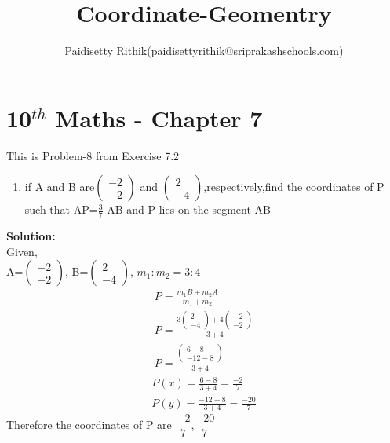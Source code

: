 \documentclass[12pt]{article}
\title{Coordinate-Geomentry}
\author{Paidisetty Rithik(paidisettyrithik@sriprakashschools.com)}
\newcommand{\myvec}[1]{\ensuremath{\begin{pmatrix}#1\end{pmatrix}}}
\newcommand{\solution}{\noindent \textbf{Solution: }}
\begin{document}
\maketitle
\section*{10$^{th}$ Maths - Chapter 7}
This is Problem-8 from Exercise 7.2
\begin{enumerate}
\item if A and B are\myvec{-2\\-2} and \myvec{2\\-4},respectively,find the coordinates of P such that
AP=$\frac{3}{7}$ AB and P lies on the segment AB \\
\end{enumerate}
\solution \\
Given,\\
A=\myvec{-2\\-2}, B=\myvec{2\\-4},
$m_1:m_2=3:4$
\begin{align}
P=\frac{m_1B+m_2A}{m_1+m_2}\\
P=\frac{3\myvec{2\\-4}+4\myvec{-2\\-2}}{3+4}\\
P=\frac{\myvec{6-8\\-12-8}}{3+4}
\end{align}
\begin{align}
P(x)=\frac{6-8}{3+4}
=\frac{-2}{7}\\
P(y)=\frac{-12-8}{3+4}
=\frac{-20}{7}
\end{align}
Therefore the coordinates of P are $\dfrac{-2}{7}$,$\dfrac{-20}{7}$
\end{document}
